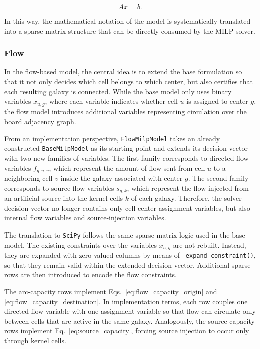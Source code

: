 \begin{equation}
A x = b.
\label{eq:exact_linear_system}
\end{equation}

In this way, the mathematical notation of the model is systematically translated into a sparse matrix structure that can be directly consumed by the MILP solver.

\subsubsection{Flow}

In the flow-based model, the central idea is to extend the base formulation so that it not only decides which cell belongs to which center, but also certifies that each resulting galaxy is connected. While the base model only uses binary variables \(x_{u,g}\), where each variable indicates whether cell \(u\) is assigned to center \(g\), the flow model introduces additional variables representing circulation over the board adjacency graph.

From an implementation perspective, \texttt{FlowMilpModel} takes an already constructed \texttt{BaseMilpModel} as its starting point and extends its decision vector with two new families of variables. The first family corresponds to directed flow variables \(f_{g,u,v}\), which represent the amount of flow sent from cell \(u\) to a neighboring cell \(v\) inside the galaxy associated with center \(g\). The second family corresponds to source-flow variables \(s_{g,k}\), which represent the flow injected from an artificial source into the kernel cells \(k\) of each galaxy. Therefore, the solver decision vector no longer contains only cell-center assignment variables, but also internal flow variables and source-injection variables.

The translation to \texttt{SciPy} follows the same sparse matrix logic used in the base model. The existing constraints over the variables \(x_{u,g}\) are not rebuilt. Instead, they are expanded with zero-valued columns by means of \texttt{\_expand\_constraint()}, so that they remain valid within the extended decision vector. Additional sparse rows are then introduced to encode the flow constraints.

The arc-capacity rows implement Eqs.~\eqref{eq:flow_capacity_origin} and
\eqref{eq:flow_capacity_destination}. In implementation terms, each row couples
one directed flow variable with one assignment variable so that flow can
circulate only between cells that are active in the same galaxy. Analogously,
the source-capacity rows implement Eq.~\eqref{eq:source_capacity}, forcing
source injection to occur only through kernel cells.

